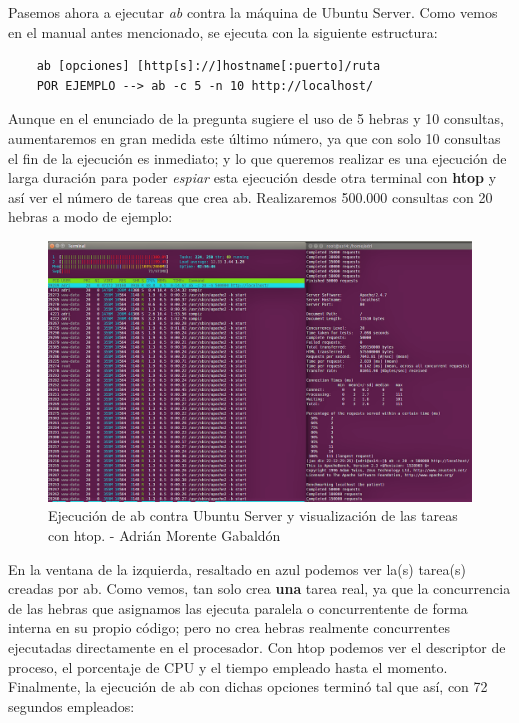 Pasemos ahora a ejecutar \textit{ab} contra la máquina de Ubuntu Server. Como vemos en el manual antes mencionado, se ejecuta con la siguiente estructura:
\begin{verbatim}
	ab [opciones] [http[s]://]hostname[:puerto]/ruta 
	POR EJEMPLO --> ab -c 5 -n 10 http://localhost/
\end{verbatim}
Aunque en el enunciado de la pregunta sugiere el uso de 5 hebras y 10 consultas, aumentaremos en gran medida este último número, ya que con solo 10 consultas el fin de la ejecución es inmediato; y lo que queremos realizar es una ejecución de larga duración para poder \textit{espiar} esta ejecución desde otra terminal con \textbf{htop} y así ver el número de tareas que crea ab. Realizaremos 500.000 consultas con 20 hebras a modo de ejemplo:
\begin{figure}[H]
	\centering
	\includegraphics[scale=0.4]{ab-exec}
	\caption{Ejecución de ab contra Ubuntu Server y visualización de las tareas con htop. - Adrián Morente Gabaldón}
	\label{figura3}
\end{figure}
En la ventana de la izquierda, resaltado en azul podemos ver la(s) tarea(s) creadas por ab. Como vemos, tan solo crea \textbf{una} tarea real, ya que la concurrencia de las hebras que asignamos las ejecuta paralela o concurrentente de forma interna en su propio código; pero no crea hebras realmente concurrentes ejecutadas directamente en el procesador.
Con htop podemos ver el descriptor de proceso, el porcentaje de CPU y el tiempo empleado hasta el momento. Finalmente, la ejecución de ab con dichas opciones terminó tal que así, con 72 segundos empleados:
